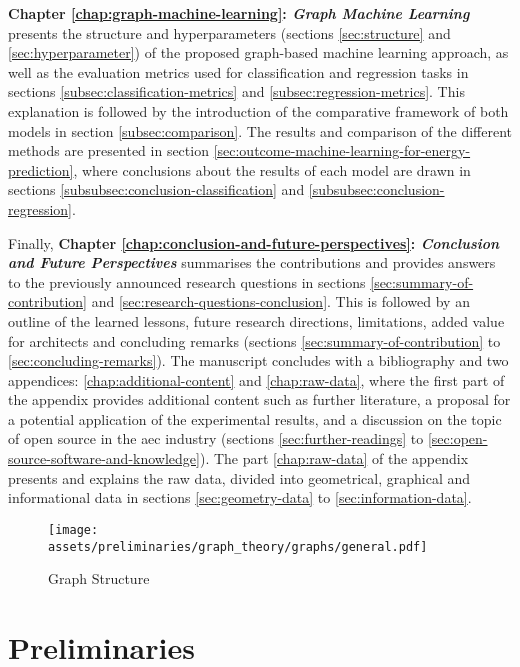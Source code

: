 \documentclass[a4paper, 12pt]{report}
\begin{document}
\textbf{Chapter \ref{chap:graph-machine-learning}: \emph{Graph Machine Learning}} presents the structure and hyperparameters (sections \ref{sec:structure} and \ref{sec:hyperparameter}) of the proposed graph-based machine learning approach, as well as the evaluation metrics used for classification and regression tasks in sections \ref{subsec:classification-metrics} and \ref{subsec:regression-metrics}. This explanation is followed by the introduction of the comparative framework of both models in section \ref{subsec:comparison}. The results and comparison of the different methods are presented in section \ref{sec:outcome-machine-learning-for-energy-prediction}, where conclusions about the results of each model are drawn in sections \ref{subsubsec:conclusion-classification} and \ref{subsubsec:conclusion-regression}.

Finally, \textbf{Chapter \ref{chap:conclusion-and-future-perspectives}: \emph{Conclusion and Future Perspectives}} summarises the contributions and provides answers to the previously announced research questions in sections \ref{sec:summary-of-contribution} and \ref{sec:research-questions-conclusion}. This is followed by an outline of the learned lessons, future research directions, limitations, added value for architects and concluding remarks (sections \ref{sec:summary-of-contribution} to \ref{sec:concluding-remarks}). The manuscript concludes with a bibliography and two appendices: \ref{chap:additional-content} and \ref{chap:raw-data}, where the first part of the appendix provides additional content such as further literature, a proposal for a potential application of the experimental results, and a discussion on the topic of \gls{open source} in the \acrshort{aec} industry (sections \ref{sec:further-readings} to \ref{sec:open-source-software-and-knowledge}). The part \ref{chap:raw-data} of the appendix presents and explains the raw data, divided into geometrical, graphical and informational data in sections \ref{sec:geometry-data} to \ref{sec:information-data}.

\begin{figure}
\centering
\texttt{[image: assets/preliminaries/graph\_theory/graphs/general.pdf]}
\caption{Graph Structure}
\label{fig:graph_structure}
\end{figure}
			
\chapter{Preliminaries}\label{chap:preliminaries}
\end{document}
